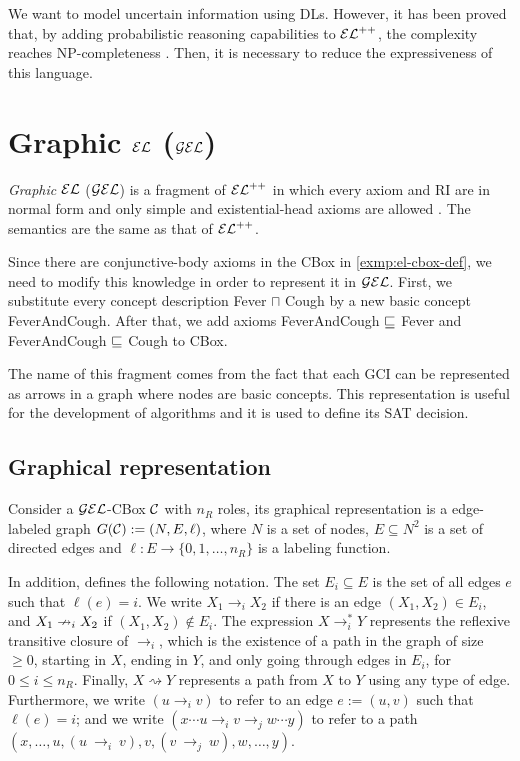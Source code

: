 We want to model uncertain information using DLs. However, it has been proved that, by adding probabilistic reasoning capabilities to $\mathcal{EL}^{++}$, the complexity reaches NP-completeness \citep{Fin2019b}. Then, it is necessary to reduce the expressiveness of this language.

\section{Graphic \texorpdfstring{$\mathcal{EL}$}{EL} (\texorpdfstring{$\mathcal{GEL}$}{GEL})}
\label{sec:gel}

\emph{Graphic} $\mathcal{EL}$ ($\mathcal{GEL}$) is a fragment of $\mathcal{EL}^{++}$ in which every axiom and RI are in normal form and only simple and existential-head axioms are allowed \citep{Fin2020}. The semantics are the same as that of $\mathcal{EL}^{++}$.

\begin{example}
	\label{exmp:gel-def}
	Since there are conjunctive-body axioms in the CBox in \autoref{exmp:el-cbox-def}, we need to modify this knowledge in order to represent it in $\mathcal{GEL}$. First, we substitute every concept description {\sffamily Fever $\sqcap$ Cough} by a new basic concept  {\sffamily FeverAndCough}. After that, we add axioms {\sffamily FeverAndCough $\sqsubseteq$ Fever} and {\sffamily FeverAndCough $\sqsubseteq$ Cough} to CBox.
\end{example}

The name of this fragment comes from the fact that each GCI can be represented as arrows in a graph where nodes are basic concepts. This representation is useful for the development of algorithms and it is used to define its SAT decision.

\subsection{Graphical representation}
\label{subsec:graph-repr}

Consider a $\mathcal{GEL}$-CBox $\mathcal{C}$ with $n_R$ roles, its graphical representation is a edge-labeled graph $G(\mathcal{C}) := (N, E, \ell)$, where $N$ is a set of nodes, $E \subseteq N^2$ is a set of directed edges and $\ell: E \to \{0, 1, \dots, n_R\}$ is a labeling function.

In addition, \citet{Fin2020} defines the following notation. The set $E_i \subseteq E$ is the set of all edges $e$ such that $\ell(e) = i$. We write $X_1 \to_i X_2$ if there is an edge $(X_1, X_2) \in E_i$, and $X_1 \nrightarrow_i X_2$ if $(X_1, X_2) \not\in E_i$. The expression $X \to_i^* Y$ represents the reflexive transitive closure of $\to_i$, which is the existence of a path in the graph of size $\geq 0$, starting in $X$, ending in $Y$, and only going through edges in $E_i$, for $0 \leq i \leq n_R$. Finally, $X \rightsquigarrow Y$ represents a path from $X$ to $Y$ using any type of edge. Furthermore, we write $(u \to_i v)$ to refer to an edge $e := (u, v)$ such that $\ell(e) = i$; and we write $(x \cdots u \to_i v \to_j w \cdots y)$ to refer to a path~$(x, \dots, u, (u~\to_i~v), v, (v~\to_j~w), w, \dots, y)$.

